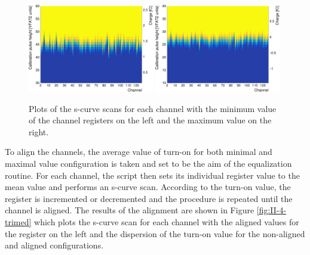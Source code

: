       \begin{figure}[h!]
        \centering
        \includegraphics[width=0.49\textwidth]{img/plots/cSCurve_ChannelVCal_Trim0-crop}
        \includegraphics[width=0.49\textwidth]{img/plots/cSCurve_ChannelVCal_Trim1-crop}
        \caption{Plots of the s-curve scans for each channel with the minimum value of the channel registers on the left and the maximum value on the right.}
        \label{fig:II-4-trim}
      \end{figure}

      To align the channels, the average value of turn-on for both minimal and maximal value configuration is taken and set to be the aim of the equalization routine. For each channel, the script then sets its individual register value to the mean value and performs an s-curve scan. According to the turn-on value, the register is incremented or decremented and the procedure is repeated until the channel is aligned. The results of the alignment are shown in Figure \ref{fig:II-4-trimed} which plots the s-curve scan for each channel with the aligned values for the register on the left and the dispersion of the turn-on value for the non-aligned and aligned configurations. \\

